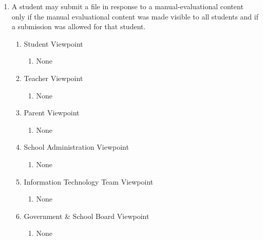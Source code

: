 \documentclass[]{article}
\begin{document}
\begin{enumerate}[{BE}1.]
	\item A student may submit a file in response to a manual-evaluational content 
only if the manual evaluational content was made visible to all students and if 
a submission was allowed for that student.
	\begin{enumerate}[{VP2}.1]
		\item Student Viewpoint
			\begin{enumerate}
				\item None
			\end{enumerate}
		\item Teacher Viewpoint
			\begin{enumerate}
				\item None
			\end{enumerate}
		\item Parent Viewpoint
			\begin{enumerate}
				\item None
			\end{enumerate}
		\item School Administration Viewpoint
			\begin{enumerate}
				\item None
			\end{enumerate}
		\item Information Technology Team Viewpoint
			\begin{enumerate}
				\item None
			\end{enumerate}
		\item Government \& School Board Viewpoint
			\begin{enumerate}
				\item None
			\end{enumerate}
	\end{enumerate}


\end{enumerate}
\end{document}
